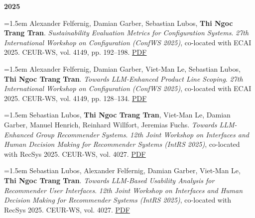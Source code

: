 \documentclass[11pt,a4paper]{article}
\newcommand{\pub}[1]{%
  \par\noindent\hangindent=1.5em\hangafter=1 #1\par\vspace{0.5ex}}
\newcommand{\pubyear}[1]{\vspace{0.7ex}\par\noindent\textbf{#1}\par\vspace{0.2ex}}
\begin{document}
\pubyear{2025}
\pub{Alexander Felfernig, Damian Garber, Sebastian Lubos, \textbf{Thi Ngoc Trang Tran}. \textit{Sustainability Evaluation Metrics for Configuration Systems}. \textit{27th International Workshop on Configuration (ConfWS 2025)}, co-located with ECAI 2025. CEUR-WS, vol. 4149, pp. 192–198. \href{https://ceur-ws.org/Vol-4149/paper16.pdf}{PDF}}
\pub{Alexander Felfernig, Damian Garber, Viet-Man Le, Sebastian Lubos, \textbf{Thi Ngoc Trang Tran}. \textit{Towards LLM-Enhanced Product Line Scoping}. \textit{27th International Workshop on Configuration (ConfWS 2025)}, co-located with ECAI 2025. CEUR-WS, vol. 4149, pp. 128–134. \href{https://ceur-ws.org/Vol-4149/paper11.pdf}{PDF}}
\pub{Sebastian Lubos, \textbf{Thi Ngoc Trang Tran}, Viet-Man Le, Damian Garber, Manuel Henrich, Reinhard Willfort, Jeremias Fuchs. \textit{Towards LLM-Enhanced Group Recommender Systems}. \textit{12th Joint Workshop on Interfaces and Human Decision Making for Recommender Systems (IntRS 2025)}, co-located with RecSys 2025. CEUR-WS, vol. 4027. \href{https://ceur-ws.org/Vol-4027/paper5.pdf}{PDF}}
\pub{Sebastian Lubos, Alexander Felfernig, Damian Garber, Viet-Man Le, \textbf{Thi Ngoc Trang Tran}. \textit{Towards LLM-Based Usability Analysis for Recommender User Interfaces}. \textit{12th Joint Workshop on Interfaces and Human Decision Making for Recommender Systems (IntRS 2025)}, co-located with RecSys 2025. CEUR-WS, vol. 4027. \href{https://ceur-ws.org/Vol-4027/paper7.pdf}{PDF}}
\end{document}
